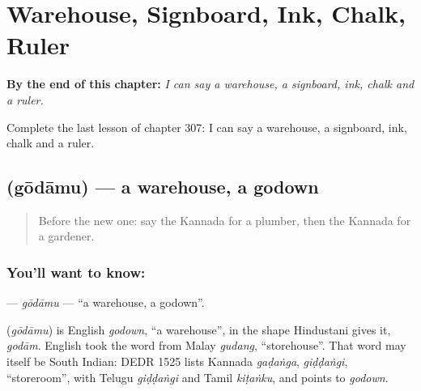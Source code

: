 
\chapter{Warehouse, Signboard, Ink, Chalk, Ruler}
\label{ch:ka-warehouse-signboard-ink-chalk-ruler}

\begin{chapteropening}
\textbf{By the end of this chapter:} \emph{I can say a warehouse, a signboard, ink, chalk and a ruler.}

Complete the last lesson of chapter 307: I can say a warehouse, a signboard, ink, chalk and a ruler.
\end{chapteropening}

\section[\texorpdfstring{\kn{ಗೋದಾಮು} (gōdāmu)}{ಗೋದಾಮು (gōdāmu)}]{ (gōdāmu) — a warehouse, a godown}

\label{lesson:KA-C307-godamu}



\begin{quote}
Before the new one: say the Kannada for a plumber, then the Kannada for a gardener.
\end{quote}

\subsection*{You'll want to know: }
\textbf{} — \emph{gōdāmu} — \textquotedblleft{}a warehouse, a godown\textquotedblright{}.

\begin{cousinweb}
\textbf{} (\emph{gōdāmu}) is English \emph{godown}, \textquotedblleft{}a warehouse\textquotedblright{}, in the shape Hindustani gives it, \emph{godām}. English took the word from Malay \emph{gudang}, \textquotedblleft{}storehouse\textquotedblright{}. That word may itself be South Indian: DEDR 1525 lists Kannada \emph{gaḍaṅga}, \emph{giḍḍaṅgi}, \textquotedblleft{}storeroom\textquotedblright{}, with Telugu \emph{giḍḍaṅgi} and Tamil \emph{kiṭaṅku}, and points to \emph{godown}.
\end{cousinweb}

